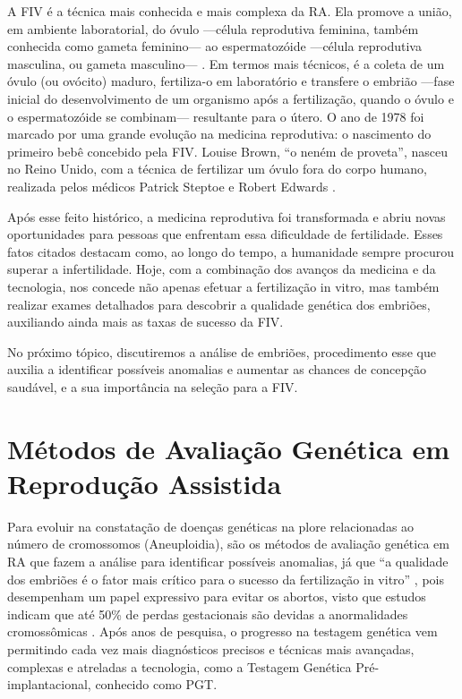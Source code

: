 A FIV é a técnica mais conhecida e mais complexa da RA. Ela promove a união, em ambiente laboratorial, do óvulo —célula reprodutiva feminina, também conhecida como gameta feminino— ao espermatozóide —célula reprodutiva masculina, ou gameta masculino— \cite{associacaobrasileira2024}. Em termos mais técnicos, é a coleta de um óvulo (ou ovócito) maduro, fertiliza-o em laboratório e transfere o embrião —fase inicial do desenvolvimento de um organismo após a fertilização, quando o óvulo e o espermatozóide se combinam— resultante para o útero.  O ano de 1978 foi marcado por uma grande evolução na medicina reprodutiva: o nascimento do primeiro bebê concebido pela FIV. Louise Brown, “o neném de proveta”, nasceu no Reino Unido, com a técnica de fertilizar um óvulo fora do corpo humano, realizada pelos médicos Patrick Steptoe e Robert Edwards \cite{corleta2010}. 

Após esse feito histórico, a medicina reprodutiva foi transformada e abriu novas oportunidades para pessoas que enfrentam essa dificuldade de fertilidade. Esses fatos citados destacam como, ao longo do tempo, a humanidade sempre procurou superar a infertilidade. Hoje, com a combinação dos avanços da medicina e da tecnologia, nos concede não apenas efetuar a fertilização in vitro, mas também realizar exames detalhados para descobrir a qualidade genética dos embriões, auxiliando ainda mais as taxas de sucesso da FIV. 

No próximo tópico, discutiremos a análise de embriões, procedimento esse que auxilia a identificar possíveis anomalias e aumentar as chances de concepção saudável, e a sua importância na seleção para a FIV.

\section{Métodos de Avaliação Genética em Reprodução Assistida}

Para evoluir na constatação de doenças genéticas na plore relacionadas ao número de cromossomos (Aneuploidia), são os métodos de avaliação genética em RA que fazem a análise para identificar possíveis anomalias, já que “a qualidade dos embriões é o fator mais crítico para o sucesso da fertilização in vitro” \cite{wang2019}, pois desempenham um papel expressivo para evitar os abortos, visto que estudos indicam que até 50\% de perdas gestacionais são devidas a anormalidades cromossômicas \cite{scienceofbiogenetics2024}. Após anos de pesquisa, o progresso na testagem genética vem permitindo cada vez mais diagnósticos precisos e técnicas mais avançadas, complexas e atreladas a tecnologia, como a Testagem Genética Pré-implantacional, conhecido como PGT.


